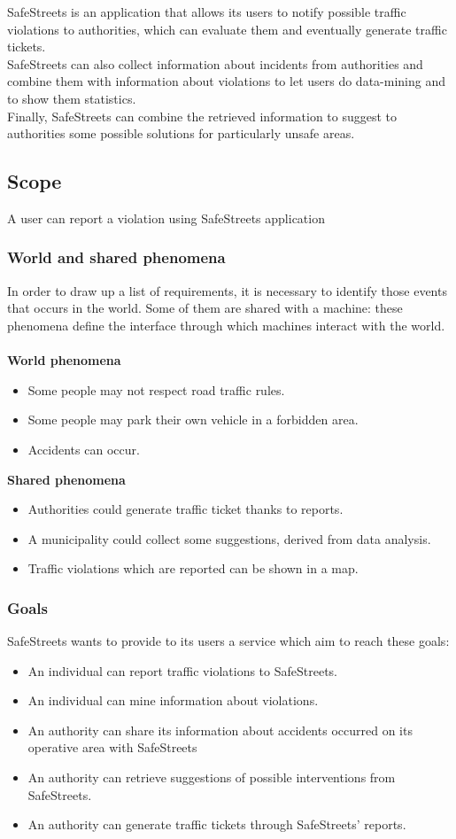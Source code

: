 \documentclass{article}
\newcommand\goal[1]{\item[{[G#1]}] }
\begin{document}
			SafeStreets is an application that allows its users to notify possible traffic violations to authorities, which can evaluate them and eventually generate traffic tickets.\\
			SafeStreets can also collect information about incidents from authorities and combine them with information about violations to let users do data-mining and to show them statistics.\\
			Finally, SafeStreets can combine the retrieved information to suggest to authorities some possible solutions for particularly unsafe areas.\\
		
		\subsection{Scope}
			A user can report a violation using SafeStreets application
			\subsubsection{World and shared phenomena}
				In order to draw up a list of requirements, it is necessary to identify those events that occurs in the world. Some of them are shared with a machine: these phenomena define the interface through which machines interact with the world.\\\\				
				\textbf{World phenomena}
				\begin{itemize}
					\item Some people may not respect road traffic rules.
					\item Some people may park their own vehicle in a forbidden area.
					\item Accidents can occur.
				\end{itemize}
				\textbf{Shared phenomena}
				\begin{itemize}
					\item Authorities could generate traffic ticket thanks to reports. 
					\item A municipality could collect some suggestions, derived from data analysis.
					\item Traffic violations which are reported can be shown in a map.
				\end{itemize}
			\subsubsection{Goals}
				SafeStreets wants to provide to its users a service which aim to reach these goals:
				\begin{itemize}
					\goal{1}An individual can report traffic violations to SafeStreets.
					\goal{2}An individual can mine information about violations.					
					\goal{3}An authority can share its information about accidents occurred on its operative area with SafeStreets
					\goal{4}An authority can retrieve suggestions of possible interventions from SafeStreets.
					\goal{5}An authority can generate traffic tickets through SafeStreets' reports.
				\end{itemize}
				
\end{document}
